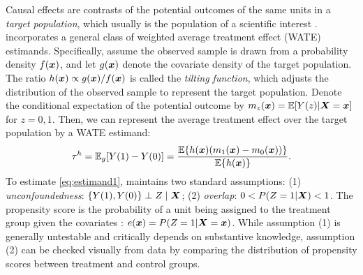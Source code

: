 Causal effects are contrasts of the potential outcomes of the same units in a \emph{target population}, which usually is the population of a scientific interest \citep{thomas2020using}.  incorporates a general class of weighted average treatment effect (WATE) estimands. Specifically, assume the observed sample is drawn from a probability density $f(\bm{x})$, and let $g(\bm{x})$ denote the covariate density of the target population. The ratio $h(\bm{x})\propto g(\bm{x})/f(\bm{x})$ is called the \emph{tilting function}, which adjusts the distribution of the observed sample to represent the target population. Denote the conditional expectation of the potential outcome by $m_z(\bm{x})=\operatorname{\mathbb E}[Y(z)|\bm{X}=\bm{x}]$ for $z=0,1$. Then, we can represent the average treatment effect over the target population by a WATE estimand:
\begin{equation}\label{eq:estimand1}
\tau^h=\operatorname{\mathbb E}_g[Y(1)-Y(0)]=\frac{\operatorname{\mathbb E}\{h(\bm{x})(m_1(\bm{x})-m_0(\bm{x}))\}}{\operatorname{\mathbb E}\{h(\bm{x})\}}.    
\end{equation}
To estimate \eqref{eq:estimand1},  maintains two standard assumptions: (1) \emph{unconfoundedness}: $\{Y(1),Y(0)\} \perp Z \mid \bm{X}$; (2) \emph{overlap}: $0<P(Z=1|\bm{X})<1$. 
The propensity score is the probability of a unit being assigned to the treatment group given the covariates \citep{Rosenbaum1983}: $e(\bm{x})=P(Z=1|\bm{X}=\bm{x})$. While assumption (1) is generally untestable and critically depends on substantive knowledge, assumption (2) can be checked visually from data by comparing the distribution of propensity scores between treatment and control groups. 

